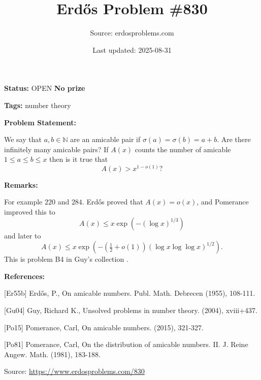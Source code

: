 \documentclass{article}
\title{Erd\H{o}s Problem \#830}
\date{Last updated: 2025-08-31}
\author{Source: erdosproblems.com}
\begin{document}
\maketitle

\noindent\textbf{Status:} OPEN \quad \textbf{No prize}

\noindent\textbf{Tags:} number theory

\medskip
\noindent\textbf{Problem Statement:}

We say that $a,b\in \mathbb{N}$ are an amicable pair if $\sigma(a)=\sigma(b)=a+b$. Are there infinitely many amicable pairs? If $A(x)$ counts the number of amicable $1\leq a\leq b\leq x$ then is it true that\[A(x)>x^{1-o(1)}?\]

\bigskip
\noindent\textbf{Remarks:}

For example $220$ and $284$. Erd\H{o}s \cite{Er55b} proved that $A(x)=o(x)$, and Pomerance \cite{Po81} improved this to\[A(x) \leq x \exp(-(\log x)^{1/3})\]and later \cite{Po15} to\[A(x) \leq x \exp(-(\tfrac{1}{2}+o(1))(\log x\log\log x)^{1/2}).\]This is problem B4 in Guy's collection \cite{Gu04}.

\bigskip
\noindent\textbf{References:}

[Er55b] Erd\H{o}s, P., On amicable numbers. Publ. Math. Debrecen (1955), 108-111.
 
 [Gu04] Guy, Richard K., Unsolved problems in number theory. (2004), xviii+437.
 
 [Po15] Pomerance, Carl, On amicable numbers. (2015), 321-327.
 
 [Po81] Pomerance, Carl, On the distribution of amicable numbers. {II}. J. Reine Angew. Math. (1981), 183-188.

\bigskip
\noindent\small{Source: \url{https://www.erdosproblems.com/830}}
\end{document}
